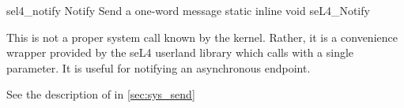 %
%
%
%

\apidoc
{sel4_notify}
{Notify}
{Send a one-word message}
{static inline void seL4\_Notify}
{
}
{\noret}
{
This is not a proper system call
known by the kernel. Rather, it is a convenience
wrapper provided by the seL4 userland library which calls
 with a single parameter. It is
useful for notifying an asynchronous endpoint.

See the description of  in \autoref{sec:sys_send}
}
